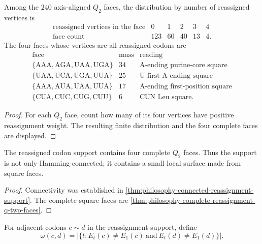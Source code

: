 \begin{theorem}
\label{thm:philosophy-complete-reassignment-q-two-faces}
Among the $240$ axis-aligned $Q_{2}$ faces, the distribution by number
of reassigned vertices is
$$
\begin{array}{c|rrrrr}
  \text{reassigned vertices in the face} & 0 & 1 & 2 & 3 & 4\\
\hline
  \text{face count} & 123 & 60 & 40 & 13 & 4.
\end{array}
$$
The four faces whose vertices are all reassigned codons are
$$
\begin{array}{c|r|l}
  \text{face} & \text{mass} & \text{reading}\\
\hline
  \{\mathrm{AAA},\mathrm{AGA},\mathrm{UAA},\mathrm{UGA}\}
    & 34 & \text{A-ending purine-core square}\\
  \{\mathrm{UAA},\mathrm{UCA},\mathrm{UGA},\mathrm{UUA}\}
    & 25 & \text{U-first A-ending square}\\
  \{\mathrm{AAA},\mathrm{AUA},\mathrm{UAA},\mathrm{UUA}\}
    & 17 & \text{A-ending first-position square}\\
  \{\mathrm{CUA},\mathrm{CUC},\mathrm{CUG},\mathrm{CUU}\}
    & 6 & \text{CUN Leu square}.
\end{array}
$$
\end{theorem}
\begin{proof}
For each $Q_{2}$ face, count how many of its four vertices have positive
reassignment weight. The resulting finite distribution and the four
complete faces are displayed.
\end{proof}

\begin{corollary}
\label{cor:philosophy-reassignment-support-small-surface}
The reassigned codon support contains four complete $Q_{2}$ faces. Thus
the support is not only Hamming-connected; it contains a small local
surface made from square faces.
\end{corollary}
\begin{proof}
Connectivity was established in
\autoref{thm:philosophy-connected-reassignment-support}. The complete
square faces are
\autoref{thm:philosophy-complete-reassignment-q-two-faces}.
\end{proof}

\begin{definition}
\label{def:philosophy-co-reassignment-edge-weight}
For adjacent codons $c\sim d$ in the reassignment support, define
$$
  \omega(c,d)
  =
  |\{t:E_{t}(c)\neq E_{1}(c)\ \text{and}\ E_{t}(d)\neq E_{1}(d)\}|.
$$
\end{definition}

